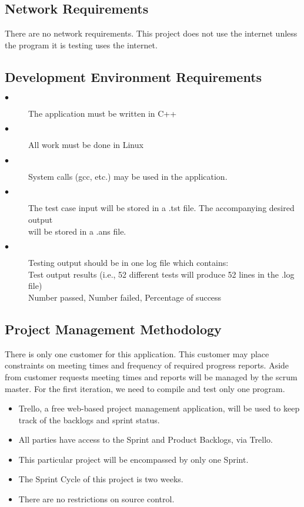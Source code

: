 \subsection{Network Requirements}
There are no network requirements. This project does not use the internet unless the program it is 
testing uses the internet.


\subsection{Development Environment Requirements}
\begin{description}
\item [$\bullet$] The application must be written in C++
\item [$\bullet$] All work must be done in Linux
\item [$\bullet$] System calls (gcc, etc.) may be used in the application.
\item [$\bullet$] The test case input will be stored in a .tst file. The accompanying
 desired output \\ will be stored in a .ans file.
\item [$\bullet$] Testing output should be in one log file which contains: \\
\hspace{4ex} Test output results (i.e., 52 different tests will produce 52 lines in the .log file) \\
\hspace{4ex} Number passed, Number failed, Percentage of success
\end{description}

\subsection{Project  Management Methodology}
There is only one customer for this application. This customer may place constraints
on meeting times and frequency of required progress reports. Aside from customer
requests meeting times and reports will be managed by the scrum master.
For the first iteration, we need to compile and test only one program. 

\begin{itemize}
\item Trello, a free web-based project management application, will be used to keep
         track of the backlogs and sprint status.
\item All parties have access to the Sprint and Product Backlogs, via Trello.
\item This particular project will be encompassed by only one Sprint.
\item The Sprint Cycle of this project is two weeks.
\item There are no restrictions on source control.
\end{itemize}

